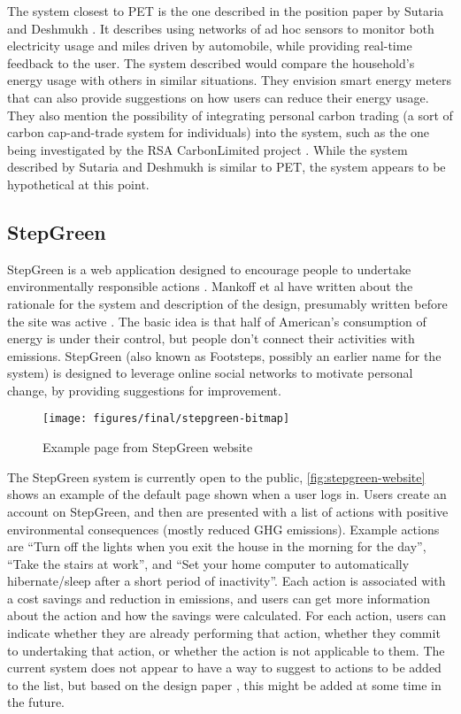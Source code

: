 The system closest to PET is the one described in the position paper by Sutaria and Deshmukh \cite{sutaria-2008}. It describes using networks of ad hoc sensors to monitor both electricity usage and miles driven by automobile, while providing real-time feedback to the user. The system described would compare the household's energy usage with others in similar situations. They envision smart energy meters that can also provide suggestions on how users can reduce their energy usage. They also mention the possibility of integrating personal carbon trading (a sort of carbon cap-and-trade system for individuals) into the system, such as the one being investigated by the RSA CarbonLimited project \cite{carbonlimited-2007}. While the system described by Sutaria and Deshmukh is similar to PET, the system appears to be hypothetical at this point.

\subsection{StepGreen}

StepGreen is a web application designed to encourage people to undertake environmentally responsible actions \cite{step-green-website}. Mankoff et al have written about the rationale for the system and description of the design, presumably written before the site was active \cite{Mankoff2007Leveraging-Soci}. The basic idea is that half of American's consumption of energy is under their control, but people don't connect their activities with \COtwo emissions. StepGreen (also known as Footsteps, possibly an earlier name for the system) is designed to leverage online social networks to motivate personal change, by providing suggestions for improvement.

\begin{figure}[htbp]
	\begin{center}
		\texttt{[image: figures/final/stepgreen-bitmap]}
		\caption{Example page from StepGreen website}
		\label{fig:stepgreen-website}
 	\end{center}
\end{figure}

The StepGreen system is currently open to the public, \autoref{fig:stepgreen-website} shows an example of the default page shown when a user logs in. Users create an account on StepGreen, and then are presented with a list of actions with positive environmental consequences (mostly reduced GHG emissions). Example actions are ``Turn off the lights when you exit the house in the morning for the day'', ``Take the stairs at work'', and ``Set your home computer to automatically hibernate/sleep after a short period of inactivity''. Each action is associated with a cost savings and reduction in \COtwo emissions, and users can get more information about the action and how the savings were calculated. For each action, users can indicate whether they are already performing that action, whether they commit to undertaking that action, or whether the action is not applicable to them. The current system does not appear to have a way to suggest to actions to be added to the list, but based on the design paper \cite{Mankoff2007Leveraging-Soci}, this might be added at some time in the future.

